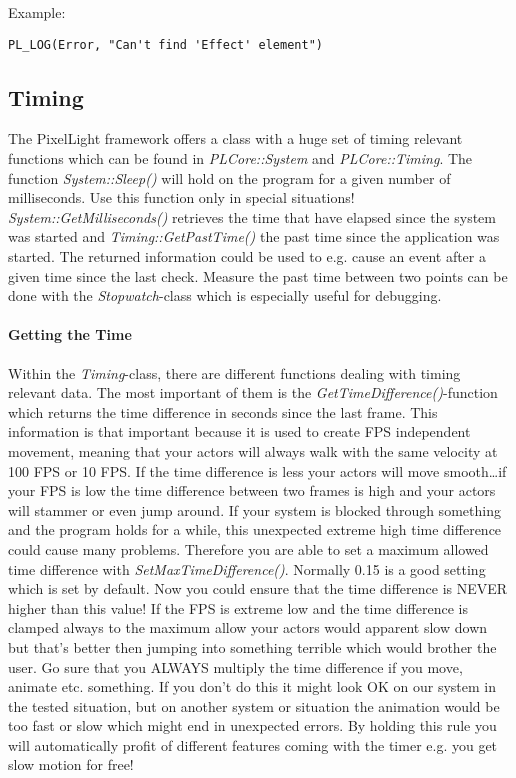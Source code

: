 Example:
\begin{lstlisting}[caption=Using the log singleton though the log macros]
PL_LOG(Error, "Can't find 'Effect' element")
\end{lstlisting}





\subsection{Timing}
The PixelLight framework offers a class with a huge set of timing relevant functions which can be found in \emph{PLCore::System} and \emph{PLCore::Timing}. The function \emph{System::Sleep()} will hold on the program for a given number of milliseconds. Use this function only in special situations! \emph{System::GetMilliseconds()} retrieves the time that have elapsed since the system was started and \emph{Timing::GetPastTime()} the past time since the application was started. The returned information could be used to e.g. cause an event after a given time since the last check. Measure the past time between two points can be done with the \emph{Stopwatch}-class which is especially useful for debugging.


\paragraph{Getting the Time}
Within the \emph{Timing}-class, there are different functions dealing with timing relevant data. The most important of them is the \emph{GetTimeDifference()}-function which returns the time difference in seconds since the last frame. This information is that important because it is used to create FPS independent movement, meaning that your actors will always walk with the same velocity at 100 FPS or 10 FPS. If the time difference is less your actors will move smooth\ldots if your FPS is low the time difference between two frames is high and your actors will stammer or even jump around. If your system is blocked through something and the program holds for a while, this unexpected extreme high time difference could cause many problems. Therefore you are able to set a maximum allowed time difference with \emph{SetMaxTimeDifference()}. Normally 0.15 is a good setting which is set by default. Now you could ensure that the time difference is NEVER higher than this value! If the FPS is extreme low and the time difference is clamped always to the maximum allow your actors would apparent slow down but that's better then jumping into something terrible which would brother the user. Go sure that you ALWAYS multiply the time difference if you move, animate etc. something. If you don't do this it might look OK on our system in the tested situation, but on another system or situation the animation would be too fast or slow which might end in unexpected errors. By holding this rule you will automatically profit of different features coming with the timer e.g. you get slow motion for free!


